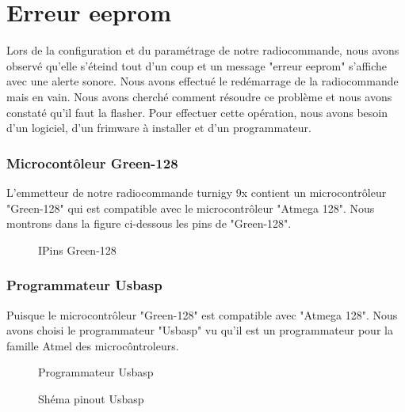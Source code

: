 	\section{Erreur eeprom}
	Lors de la configuration et du paramétrage de notre radiocommande, nous avons observé qu'elle s'éteind tout d'un coup et un message "erreur eeprom" s'affiche avec une alerte sonore. Nous avons effectué le redémarrage de la radiocommande mais en vain. Nous avons cherché comment résoudre ce problème et nous avons constaté qu'il faut la flasher. Pour effectuer cette opération, nous avons besoin d'un logiciel, d'un frimware à installer et d'un programmateur.
	\subsubsection{Microcontôleur Green-128}
	L'emmetteur de notre radiocommande turnigy 9x contient un microcontrôleur "Green-128" qui est compatible avec le microcontrôleur  "Atmega 128". Nous montrons dans la figure ci-dessous les pins de "Green-128". 
	\begin{figure}[h]
		\begin{center}
			\centering
		\end{center}
		\caption{IPins Green-128}
	\end{figure}
	\subsubsection{Programmateur Usbasp}
	Puisque le microcontrôleur "Green-128" est compatible avec "Atmega 128". Nous avons choisi le programmateur "Usbasp" vu qu'il est un programmateur pour la famille Atmel des microcôntroleurs. 
	
	\begin{figure}[h]
		\begin{center}
			\begin{minipage}{0.49\textwidth}
				\centering
				\hspace*{-1.5cm}
				\centering
				\hspace*{-1cm}\caption{Programmateur Usbasp}
				\label{fig:my_label}
			\end{minipage}
			\begin{minipage}{0.49\textwidth}
				\centering
				\centering
				\hspace{1cm}\caption{Shéma pinout Usbasp}
				\label{fig:my_label}
			\end{minipage}
		\end{center}
	\end{figure}
	
